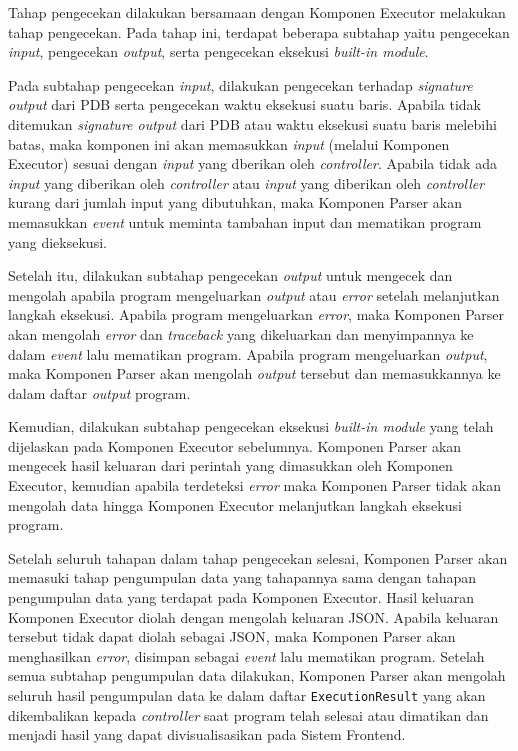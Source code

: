 Tahap pengecekan dilakukan bersamaan dengan Komponen Executor melakukan tahap pengecekan. Pada tahap ini, terdapat beberapa subtahap yaitu pengecekan \textit{input}, pengecekan \textit{output}, serta pengecekan eksekusi \textit{built-in module}.

Pada subtahap pengecekan \textit{input}, dilakukan pengecekan terhadap \textit{signature output} dari PDB serta pengecekan waktu eksekusi suatu baris. Apabila tidak ditemukan \textit{signature output} dari PDB atau waktu eksekusi suatu baris melebihi batas, maka komponen ini akan memasukkan \textit{input} (melalui Komponen Executor) sesuai dengan \textit{input} yang dberikan oleh \textit{controller}. Apabila tidak ada \textit{input} yang diberikan oleh \textit{controller} atau \textit{input} yang diberikan oleh \textit{controller} kurang dari jumlah input yang dibutuhkan, maka Komponen Parser akan memasukkan \textit{event} untuk meminta tambahan input dan mematikan program yang dieksekusi.

Setelah itu, dilakukan subtahap pengecekan \textit{output} untuk mengecek dan mengolah apabila program mengeluarkan \textit{output} atau \textit{error} setelah melanjutkan langkah eksekusi. Apabila program mengeluarkan \textit{error}, maka Komponen Parser akan mengolah \textit{error} dan \textit{traceback} yang dikeluarkan dan menyimpannya ke dalam \textit{event} lalu mematikan program. Apabila program mengeluarkan \textit{output}, maka Komponen Parser akan mengolah \textit{output} tersebut dan memasukkannya ke dalam daftar \textit{output} program.

Kemudian, dilakukan subtahap pengecekan eksekusi \textit{built-in module} yang telah dijelaskan pada Komponen Executor sebelumnya. Komponen Parser akan mengecek hasil keluaran dari perintah yang dimasukkan oleh Komponen Executor, kemudian apabila terdeteksi \textit{error} maka Komponen Parser tidak akan mengolah data hingga Komponen Executor melanjutkan langkah eksekusi program.

Setelah seluruh tahapan dalam tahap pengecekan selesai, Komponen Parser akan memasuki tahap pengumpulan data yang tahapannya sama dengan tahapan pengumpulan data yang terdapat pada Komponen Executor. Hasil keluaran Komponen Executor diolah dengan mengolah keluaran JSON. Apabila keluaran tersebut tidak dapat diolah sebagai JSON, maka Komponen Parser akan menghasilkan \textit{error}, disimpan sebagai \textit{event} lalu mematikan program. Setelah semua subtahap pengumpulan data dilakukan, Komponen Parser akan mengolah seluruh hasil pengumpulan data ke dalam daftar \verb|ExecutionResult| yang akan dikembalikan kepada \textit{controller} saat program telah selesai atau dimatikan dan menjadi hasil yang dapat divisualisasikan pada Sistem Frontend.

